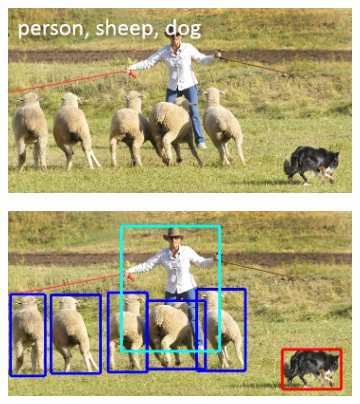 \begin{figure}[h]
    \newcommand{\VisionTasksImageWidth}{0.4\textwidth}
    \centering
    \begin{subfigure}{\VisionTasksImageWidth}
        \includegraphics[width=\textwidth]{images/vision_task_1}
        \caption{}
        \label{fig:cv_task_imgclass}
    \end{subfigure}
    \hspace{5mm}
    \begin{subfigure}{\VisionTasksImageWidth}
        \includegraphics[width=\textwidth]{images/vision_task_2}
        \caption{}
        \label{fig:cv_task_objloc}
    \end{subfigure}

    \vspace{5mm}
    

\end{figure}
